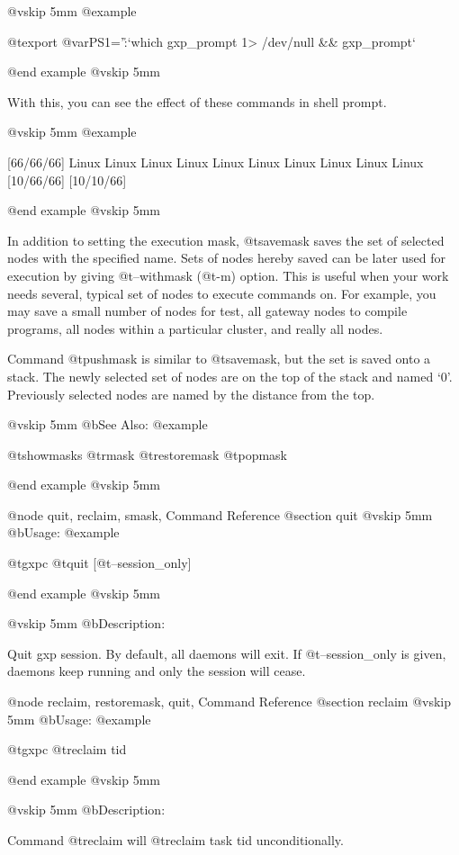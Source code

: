 @vskip 5mm
@example

  @t{export} @var{PS1}='\h:\W`which gxp_prompt 1> /dev/null && gxp_prompt`%

@end example
@vskip 5mm

With this, you can see the effect of these commands in shell
prompt.

@vskip 5mm
@example

  [66/66/66]%
  Linux
  Linux
  Linux
  Linux
  Linux
  Linux
  Linux
  Linux
  Linux
  Linux
  [10/66/66]%
  [10/10/66]%

@end example
@vskip 5mm

In addition to setting the execution mask, @t{savemask} saves the set
of selected nodes with the specified name. Sets of nodes hereby
saved can be later used for execution by giving @t{--withmask} (@t{-m})
option. This is useful when your work needs several, typical set
of nodes to execute commands on. For example, you may save a
small number of nodes for test, all gateway nodes to compile
programs, all nodes within a particular cluster, and really all
nodes.

Command @t{pushmask} is similar to @t{savemask}, but the set is saved
onto a stack. The newly selected set of nodes are on the top of
the stack and named `0'.  Previously selected nodes are named by
the distance from the top.

@vskip 5mm
@b{See Also:}
@example

  @t{showmasks} @t{rmask} @t{restoremask} @t{popmask}

@end example
@vskip 5mm

@node quit, reclaim, smask, Command Reference
@section quit
@vskip 5mm
@b{Usage:}
@example

  @t{gxpc} @t{quit} [@t{--session_only}]

@end example
@vskip 5mm

@vskip 5mm
@b{Description:}


  Quit gxp session. By default, all daemons will exit.
If @t{--session_only} is given, daemons keep running and only the 
session will cease.

@node reclaim, restoremask, quit, Command Reference
@section reclaim
@vskip 5mm
@b{Usage:}
@example

  @t{gxpc} @t{reclaim} tid

@end example
@vskip 5mm

@vskip 5mm
@b{Description:}


  Command @t{reclaim} will @t{reclaim} task tid unconditionally.

